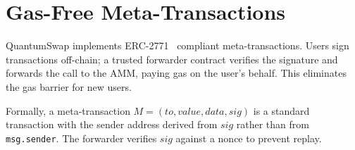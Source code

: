 \section{Gas-Free Meta-Transactions}


QuantumSwap implements ERC-2771~\cite{erc2771} compliant
meta-transactions. Users sign transactions off-chain; a trusted
forwarder contract verifies the signature and forwards the call to the
AMM, paying gas on the user's behalf. This eliminates the gas barrier
for new users.

Formally, a meta-transaction $M = (\mathit{to}, \mathit{value},
\mathit{data}, \mathit{sig})$ is a standard transaction with the sender
address derived from $\mathit{sig}$ rather than from \texttt{msg.sender}.
The forwarder verifies $\mathit{sig}$ against a nonce to prevent replay.

